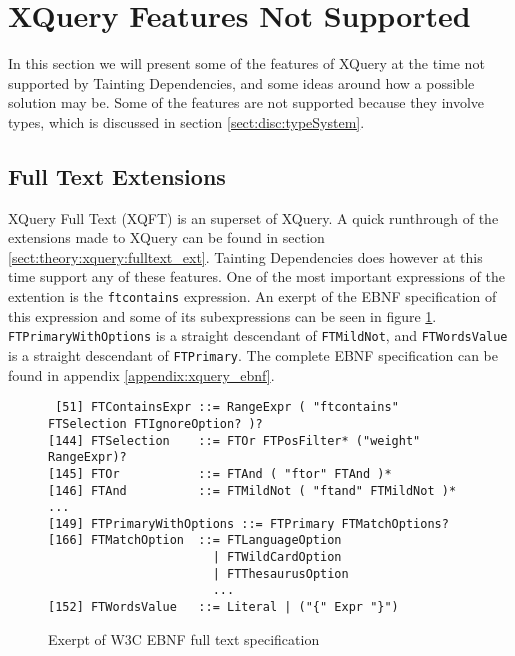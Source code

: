 \section{XQuery Features Not Supported}
\label{sect:disc:notSupported}

In this section we will present some of the features of XQuery at the time not supported by Tainting Dependencies,
and some ideas around how a possible solution may be. Some of the features are not supported because they involve
types, which is discussed in section \ref{sect:disc:typeSystem}. %
 

\subsection{Full Text Extensions}
XQuery Full Text\cite{w3c01} (XQFT) is an superset of XQuery. A quick runthrough of the extensions made to XQuery
can be found in section \ref{sect:theory:xquery:fulltext_ext}. Tainting Dependencies does however at this time
support any of these features. One of the most important expressions of the extention is the \texttt{ftcontains}
expression. An exerpt of the EBNF specification of this expression and some of its subexpressions can be seen in
figure \ref{fig:disc:xqftEBNF}. \texttt{FTPrimaryWithOptions} is a straight descendant of \texttt{FTMildNot}, and
\texttt{FTWordsValue} is a straight descendant of \texttt{FTPrimary}. The complete EBNF specification can be found
in appendix \ref{appendix:xquery_ebnf}.
\begin{figure}[h]
\begin{Verbatim}
 [51] FTContainsExpr ::= RangeExpr ( "ftcontains" FTSelection FTIgnoreOption? )?
[144] FTSelection    ::= FTOr FTPosFilter* ("weight" RangeExpr)?
[145] FTOr           ::= FTAnd ( "ftor" FTAnd )*
[146] FTAnd          ::= FTMildNot ( "ftand" FTMildNot )*
...
[149] FTPrimaryWithOptions ::= FTPrimary FTMatchOptions?
[166] FTMatchOption  ::= FTLanguageOption
                       | FTWildCardOption
                       | FTThesaurusOption
                       ...
[152] FTWordsValue   ::= Literal | ("{" Expr "}")
\end{Verbatim}

\caption{Exerpt of W3C EBNF full text specification\cite{w3c01} \label{fig:disc:xqftEBNF}}
\end{figure}

